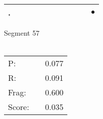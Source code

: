 \documentclass[landscape]{article}
\newcommand{\ssp}{\hspace{2pt}}
\newcommand{\mex}{\cellcolor{g}$\bullet$}
\begin{document}
\begin{tabular}{|l|p{10pt}|p{10pt}|p{10pt}|p{10pt}|p{10pt}|p{10pt}|p{10pt}|p{10pt}|p{10pt}|p{10pt}|}
\hline
\ssp \cellcolor{ref9}. \ssp&\hspace{2pt}&\hspace{2pt}&\hspace{2pt}&\hspace{2pt}&\hspace{2pt}&\hspace{2pt}&\hspace{2pt}&\hspace{2pt}&\hspace{2pt}&\hspace{2pt}\mex\\
\hline
\end{tabular}

\vspace{6pt}
\noindent Segment 57\\\\
\noindent\begin{tabular}{lm{12pt}r}
\hline
P:&&0.077\\
R:&&0.091\\
Frag:&&0.600\\
Score:&&0.035\\
\end{tabular}

\newpage
\end{document}

